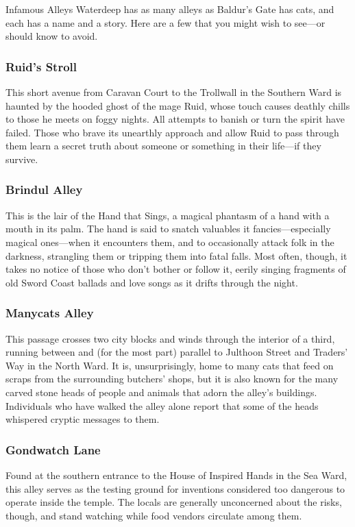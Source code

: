 \documentclass[10pt,a4paper,twoside,twocolumn,openany,nodeprecatedcode]{dndbook}
\begin{document}
\begin{DndComment}{Infamous Alleys}
Waterdeep has as many alleys as Baldur's Gate has cats, and each has a name and a story. Here are a few that you might wish to see—or should know to avoid.
\subsubsection{Ruid's Stroll}
This short avenue from Caravan Court to the Trollwall in the Southern Ward is haunted by the hooded ghost of the mage Ruid, whose touch causes deathly chills to those he meets on foggy nights. All attempts to banish or turn the spirit have failed. Those who brave its unearthly approach and allow Ruid to pass through them learn a secret truth about someone or something in their life—if they survive.
\subsubsection{Brindul Alley}
This is the lair of the Hand that Sings, a magical phantasm of a hand with a mouth in its palm. The hand is said to snatch valuables it fancies—especially magical ones—when it encounters them, and to occasionally attack folk in the darkness, strangling them or tripping them into fatal falls. Most often, though, it takes no notice of those who don't bother or follow it, eerily singing fragments of old Sword Coast ballads and love songs as it drifts through the night.
\subsubsection{Manycats Alley}
This passage crosses two city blocks and winds through the interior of a third, running between and (for the most part) parallel to Julthoon Street and Traders' Way in the North Ward. It is, unsurprisingly, home to many cats that feed on scraps from the surrounding butchers' shops, but it is also known for the many carved stone heads of people and animals that adorn the alley's buildings. Individuals who have walked the alley alone report that some of the heads whispered cryptic messages to them.
\subsubsection{Gondwatch Lane}
Found at the southern entrance to the House of Inspired Hands in the Sea Ward, this alley serves as the testing ground for inventions considered too dangerous to operate inside the temple. The locals are generally unconcerned about the risks, though, and stand watching while food vendors circulate among them.

\end{DndComment}
\end{document}
